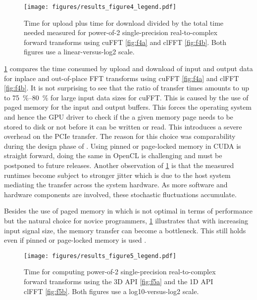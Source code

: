 \begin{figure}[!tbp]
  \centering
  \texttt{[image: figures/results\_figure4\_legend.pdf]}
  \hfill
  \caption{Time for upload plus time for download divided by the total time needed measured for power-of-2 single-precision real-to-complex forward transforms using cuFFT \cref{fig:f4a} and clFFT \cref{fig:f4b}. Both figures use a linear-versus-log2 scale.}
  \label{fig:device_transfer}
\end{figure}

\cref{fig:device_transfer} compares the time consumed by upload and download of input and output data for inplace and out-of-place FFT transforms using cuFFT \cref{fig:f4a} and clFFT \cref{fig:f4b}. It is not surprising to see that the ratio of transfer times amounts to up to \SIrange{75}{80}{\percent} for large input data sizes for cuFFT. This is caused by the use of paged memory for the input and output buffers. This forces the operating system and hence the GPU driver to check if the a given memory page needs to be stored to disk or not before it can be written or read. This introduces a severe overhead on the PCIe transfer. The reason for this choice was comparability during the design phase of \gearshifft{}. Using pinned or page-locked memory in CUDA is straight forward, doing the same in OpenCL is challenging and must be postponed to future releases. Another observation of \cref{fig:device_transfer} is that the measured runtimes become subject to stronger jitter  which is due to the host system mediating the transfer across the system hardware. As more software and hardware components are involved, these stochastic fluctuations accumulate. 

Besides the use of paged memory in \gearshifft{} which is not optimal in terms of performance but the natural choice for novice programmers, \cref{fig:device_transfer} illustrates that with increasing input signal size, the memory transfer can become a bottleneck. This still holds even if pinned or page-locked memory is used \cite{steinbach_gtc2015}.

\begin{figure}[!tbp]
  \centering
  \texttt{[image: figures/results\_figure5\_legend.pdf]}
  \hfill
  \caption{Time for computing power-of-2 single-precision real-to-complex forward transforms using the 3D API \cref{fig:f5a} and the 1D API clFFT \cref{fig:f5b}. Both figures use a log10-versus-log2 scale.}
  \label{fig:r2c_fwd}
\end{figure}

